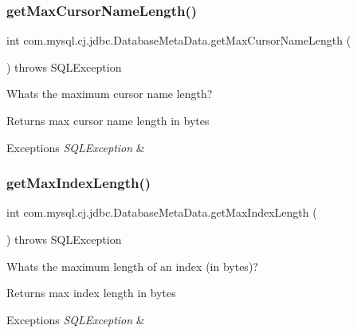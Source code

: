 \subsubsection{\texorpdfstring{get\+Max\+Cursor\+Name\+Length()}{getMaxCursorNameLength()}}
{\footnotesize\ttfamily int com.\+mysql.\+cj.\+jdbc.\+Database\+Meta\+Data.\+get\+Max\+Cursor\+Name\+Length (\begin{DoxyParamCaption}{ }\end{DoxyParamCaption}) throws S\+Q\+L\+Exception}

What\textquotesingle{}s the maximum cursor name length?

\begin{DoxyReturn}{Returns}
max cursor name length in bytes 
\end{DoxyReturn}

\begin{DoxyExceptions}{Exceptions}
{\em S\+Q\+L\+Exception} & \\
\hline
\end{DoxyExceptions}
\mbox{\label{classcom_1_1mysql_1_1cj_1_1jdbc_1_1_database_meta_data_a2a51a83e52633c6ec15442648af0cf12}} 
\subsubsection{\texorpdfstring{get\+Max\+Index\+Length()}{getMaxIndexLength()}}
{\footnotesize\ttfamily int com.\+mysql.\+cj.\+jdbc.\+Database\+Meta\+Data.\+get\+Max\+Index\+Length (\begin{DoxyParamCaption}{ }\end{DoxyParamCaption}) throws S\+Q\+L\+Exception}

What\textquotesingle{}s the maximum length of an index (in bytes)?

\begin{DoxyReturn}{Returns}
max index length in bytes 
\end{DoxyReturn}

\begin{DoxyExceptions}{Exceptions}
{\em S\+Q\+L\+Exception} & \\
\hline
\end{DoxyExceptions}
\mbox{\label{classcom_1_1mysql_1_1cj_1_1jdbc_1_1_database_meta_data_a298c4827786b7801d1bc85a37c643a3b}} 
